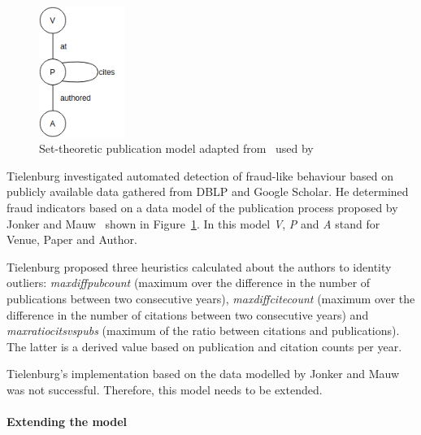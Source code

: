\documentclass{ou-report}
\newcommand{\todo}[1]{{\color{red} TODO: #1}}
\begin{document}
\begin{figure}
    \centering
    \includegraphics[width=0.25\textwidth]{images/jm2017_undiced_pub_view.drawio.png}
    \caption{Set-theoretic publication model adapted from~\cite{JM2017} used 
by~\cite{TEJ2017}}
    \label{fig:rw_jm2017}
\end{figure}

Tielenburg investigated automated detection of fraud-like behaviour based on
publicly available data ga\-thered from DBLP and Google Scholar. He determined 
fraud indicators based on a data model of the publication process proposed by 
Jonker and Mauw~\cite{JM2017} shown in Figure~\ref{fig:rw_jm2017}. In this 
model \textit{V}, \textit{P} and \textit{A} stand for Venue, Paper and Author.




Tielenburg proposed three heuristics calculated about the authors to identity 
outliers: 
\textit{maxdiffpubcount} (maximum over the difference in the number of 
publications between two consecutive years), \textit{maxdiffcitecount} (maximum 
over the difference in the number of citations between two consecutive years) 
and \textit{maxratiocitsvspubs} (maximum of the ratio between citations and 
publications). The latter is a derived value based on publication 
and citation counts per year.

Tielenburg's implementation based on the data modelled by Jonker and Mauw was 
not successful. Therefore, this model needs to be extended.

\paragraph{Extending the model}
\end{document}

